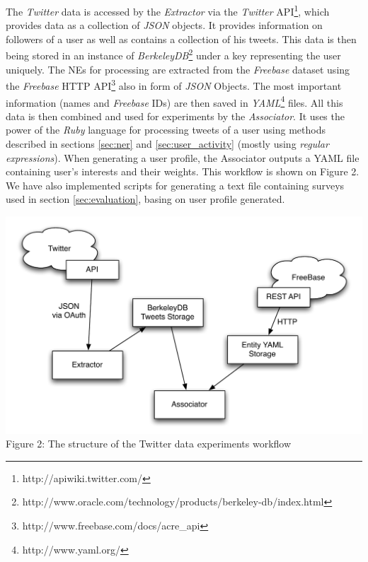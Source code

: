 The \textit{Twitter} data is accessed by the \textit{Extractor} via the \textit{Twitter}
API\footnote{http://apiwiki.twitter.com/}, which provides data as a collection of \textit{JSON} objects. It provides
information on followers of a user as well as contains a collection of his tweets. This data is then being
stored in an instance of \textit{BerkeleyDB}\footnote{http://www.oracle.com/technology/products/berkeley-db/index.html}
under a key representing the user uniquely. The NEs for processing are extracted from the \textit{Freebase}
dataset using the \textit{Freebase} HTTP API\footnote{http://www.freebase.com/docs/acre\_api} also in
form of \textit{JSON} Objects. The most important information (names and \textit{Freebase} IDs) are then
saved in \textit{YAML}\footnote{http://www.yaml.org/} files. All this data is then combined and used
for experiments by the \textit{Associator}. It uses the power of the \textit{Ruby} language for processing tweets
of a user using methods described in sections \ref{sec:ner} and \ref{sec:user_activity} (mostly using \textit{regular
expressions}). When generating a user profile, the Associator outputs a YAML file containing user's interests and
their weights. This workflow is shown on Figure 2. We have also implemented scripts for generating a text file
containing surveys used in section \ref{sec:evaluation}, basing on user profile generated.

\begin{center}
  \includegraphics[scale=0.65]{images/twitter_diagram.pdf} \\
  Figure 2: The structure of the Twitter data experiments workflow
\end{center}

